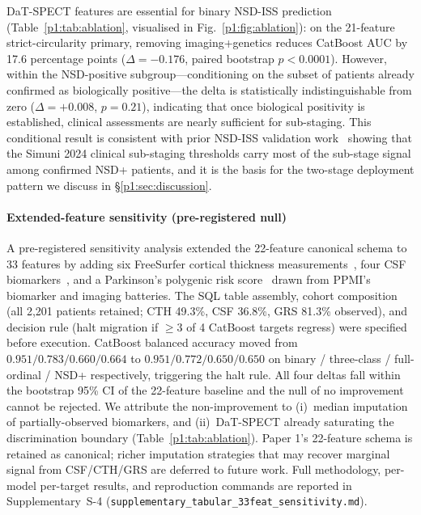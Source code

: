 DaT-SPECT features are essential for binary NSD-ISS prediction (Table~\ref{p1:tab:ablation}, visualised in Fig.~\ref{p1:fig:ablation}): on the 21-feature strict-circularity primary, removing imaging+genetics reduces CatBoost AUC by 17.6 percentage points ($\Delta{=}-0.176$, paired bootstrap $p{<}0.0001$). However, within the NSD-positive subgroup---conditioning on the subset of patients already confirmed as biologically positive---the delta is statistically indistinguishable from zero ($\Delta{=}+0.008$, $p{=}0.21$), indicating that once biological positivity is established, clinical assessments are nearly sufficient for sub-staging. This conditional result is consistent with prior NSD-ISS validation work~\cite{simuni2024val,russo2025} showing that the Simuni 2024 clinical sub-staging thresholds carry most of the sub-stage signal among confirmed NSD+ patients, and it is the basis for the two-stage deployment pattern we discuss in \S\ref{p1:sec:discussion}.

\paragraph*{Extended-feature sensitivity (pre-registered null)} A pre-registered sensitivity analysis extended the 22-feature canonical schema to 33 features by adding six FreeSurfer cortical thickness measurements~\cite{fischl2012}, four CSF biomarkers~\cite{mollenhauer2017}, and a Parkinson's polygenic risk score~\cite{nalls2019} drawn from PPMI's biomarker and imaging batteries. The SQL table assembly, cohort composition (all 2{,}201 patients retained; CTH 49.3\%, CSF 36.8\%, GRS 81.3\% observed), and decision rule (halt migration if $\geq3$ of 4 CatBoost targets regress) were specified before execution. CatBoost balanced accuracy moved from $0.951 / 0.783 / 0.660 / 0.664$ to $0.951 / 0.772 / 0.650 / 0.650$ on binary / three-class / full-ordinal / NSD+ respectively, triggering the halt rule. All four deltas fall within the bootstrap 95\% CI of the 22-feature baseline and the null of no improvement cannot be rejected. We attribute the non-improvement to (i)~median imputation of partially-observed biomarkers, and (ii)~DaT-SPECT already saturating the discrimination boundary (Table~\ref{p1:tab:ablation}). Paper 1's 22-feature schema is retained as canonical; richer imputation strategies that may recover marginal signal from CSF/CTH/GRS are deferred to future work. Full methodology, per-model per-target results, and reproduction commands are reported in Supplementary~S-4 (\texttt{supplementary\_tabular\_33feat\_sensitivity.md}).

